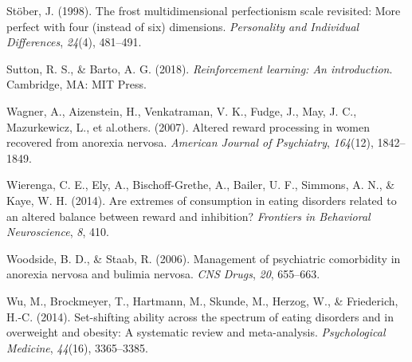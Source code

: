\documentclass[
  man,floatsintext]{apa6}
\newlength{\cslhangindent}
\newlength{\cslentryspacingunit} %
\newenvironment{CSLReferences}[2] %
 {%
  \setlength{\parindent}{0pt}
  \ifodd #1
  \let\oldpar\par
  \def\par{\hangindent=\cslhangindent\oldpar}
  \fi
  \setlength{\parskip}{#2\cslentryspacingunit}
 }%
 {}
\begin{document}
\begin{CSLReferences}{1}{0}
\leavevmode{}%
Stöber, J. (1998). The frost multidimensional perfectionism scale revisited: More perfect with four (instead of six) dimensions. \emph{Personality and Individual Differences}, \emph{24}(4), 481--491.

\leavevmode{}%
Sutton, R. S., \& Barto, A. G. (2018). \emph{Reinforcement learning: An introduction}. Cambridge, MA: MIT Press.

\leavevmode{}%
Wagner, A., Aizenstein, H., Venkatraman, V. K., Fudge, J., May, J. C., Mazurkewicz, L., et al.others. (2007). Altered reward processing in women recovered from anorexia nervosa. \emph{American Journal of Psychiatry}, \emph{164}(12), 1842--1849.

\leavevmode{}%
Wierenga, C. E., Ely, A., Bischoff-Grethe, A., Bailer, U. F., Simmons, A. N., \& Kaye, W. H. (2014). Are extremes of consumption in eating disorders related to an altered balance between reward and inhibition? \emph{Frontiers in Behavioral Neuroscience}, \emph{8}, 410.

\leavevmode{}%
Woodside, B. D., \& Staab, R. (2006). Management of psychiatric comorbidity in anorexia nervosa and bulimia nervosa. \emph{CNS Drugs}, \emph{20}, 655--663.

\leavevmode{}%
Wu, M., Brockmeyer, T., Hartmann, M., Skunde, M., Herzog, W., \& Friederich, H.-C. (2014). Set-shifting ability across the spectrum of eating disorders and in overweight and obesity: A systematic review and meta-analysis. \emph{Psychological Medicine}, \emph{44}(16), 3365--3385.

\end{CSLReferences}
\end{document}
